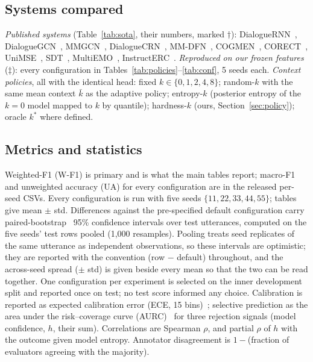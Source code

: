 \documentclass[journal]{IEEEtran}
\newcommand{\wf}{W-F1}
\newcommand{\kbar}{\bar{k}}
\begin{document}
\subsection{Systems compared}
\emph{Published systems} (Table~\ref{tab:sota}, their numbers, marked $\dagger$): DialogueRNN~\cite{majumder2019dialoguernn}, DialogueGCN~\cite{ghosal2019dialoguegcn}, MMGCN~\cite{hu2021mmgcn}, DialogueCRN~\cite{hu2021dialoguecrn}, MM-DFN~\cite{hu2022mmdfn}, COGMEN~\cite{joshi2022cogmen}, CORECT~\cite{nguyen2023corect}, UniMSE~\cite{hu2022unimse}, SDT~\cite{ma2024sdt}, MultiEMO~\cite{shi2023multiemo}, InstructERC~\cite{lei2023instructerc}. \emph{Reproduced on our frozen features} ($\ddagger$): every configuration in Tables~\ref{tab:policies}--\ref{tab:conf}, 5 seeds each. \emph{Context policies}, all with the identical head: fixed $k \in \{0,1,2,4,8\}$; random-$k$ with the same mean context $\kbar$ as the adaptive policy; entropy-$k$ (posterior entropy of the $k = 0$ model mapped to $k$ by quantile); hardness-$k$ (ours, Section~\ref{sec:policy}); oracle $k^*$ where defined.

\subsection{Metrics and statistics}
Weighted-F1 (\wf) is primary and is what the main tables report; macro-F1 and unweighted accuracy (UA) for every configuration are in the released per-seed CSVs. Every configuration is run with five seeds $\{11, 22, 33, 44, 55\}$; tables give mean $\pm$ std. Differences against the pre-specified default configuration carry paired-bootstrap~\cite{efron1993bootstrap} 95\% confidence intervals over test utterances, computed on the five seeds' test rows pooled (1{,}000 resamples). Pooling treats seed replicates of the same utterance as independent observations, so these intervals are optimistic; they are reported with the convention (row $-$ default) throughout, and the across-seed spread ($\pm$ std) is given beside every mean so that the two can be read together. One configuration per experiment is selected on the inner development split and reported once on test; no test score informed any choice. Calibration is reported as expected calibration error (ECE, 15 bins)~\cite{guo2017calibration}; selective prediction as the area under the risk--coverage curve (AURC)~\cite{geifman2019aurc} for three rejection signals (model confidence, $h$, their sum). Correlations are Spearman $\rho$, and partial $\rho$ of $h$ with the outcome given model entropy. Annotator disagreement is $1 - $(fraction of evaluators agreeing with the majority).
\end{document}
